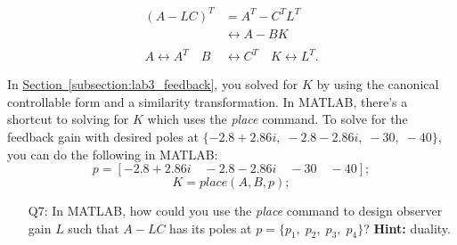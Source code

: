 \documentclass[12pt]{report}
\newcommand\drew[1]{\textcolor{red}{#1}}
\begin{document}
\begin{align*}
    (A-LC)^T                      & = A^T - C^T L^T                                  \\
                                  & \leftrightarrow A - BK                           \\
    \\
    A \leftrightarrow A^T \quad B & \leftrightarrow C^T \quad K \leftrightarrow L^T.
\end{align*}

In \hyperref[subsection:lab3_feedback]{Section~\ref{subsection:lab3_feedback}}, you solved for $K$ by using the canonical controllable form and a similarity transformation. In MATLAB, there's a shortcut to solving for $K$ which uses the \emph{place} command. To solve for the feedback gain with desired poles at $\{-2.8 + 2.86i, \; -2.8 - 2.86i, \; -30, \; -40\}$, you can do the following in MATLAB:
\[
    p = [-2.8 + 2.86i \quad -2.8 - 2.86i \quad -30 \quad -40];
\]
\[
    K = place(A,B,p);
\]
\begin{enumerate}[Question]
    \item[Q7:] In MATLAB, how could you use the \emph{place} command to design observer gain $L$ such that $A-LC$ has its poles at $p =\{p_1, \; p_2, \; p_3, \; p_4\}$? \textbf{Hint:} duality.\\
\end{enumerate}
\end{document}
